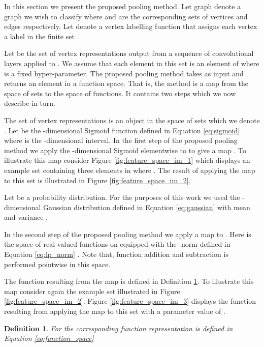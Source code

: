 \documentclass[runningheads]{llncs}
\newtheorem{mydef}{Definition}
\begin{document}
In this section we present the proposed pooling method. Let graph  denote a graph we wish to classify where  and  are the corresponding sets of vertices and edges respectively. Let  denote a vertex labelling function that assigns each vertex  a label  in the finite set .

Let  be the set of vertex representations output from a sequence of convolutional layers applied to . We assume that each element in this set is an element of  where  is a fixed hyper-parameter. The proposed pooling method takes as input  and returns an element in a function space. That is, the method is a map from the space of sets to the space of functions. It contains two steps which we now describe in turn.

The set of vertex representations  is an object in the space of sets which we denote . Let  be the -dimensional Sigmoid function defined in Equation \ref{eq:sigmoid} where  is the -dimensional interval. In the first step of the proposed pooling method we apply the -dimensional Sigmoid elementwise to  to give a map . To illustrate this map consider Figure \ref{fig:feature_space_im_1} which displays an example set  containing three elements in  where . The result of applying the map  to this set is illustrated in Figure \ref{fig:feature_space_im_2}.



Let  be a probability distribution. For the purposes of this work we used the -dimensional Gaussian distribution defined in Equation \ref{eq:gaussian} with mean  and variance .



In the second step of the proposed pooling method we apply a map  to . Here  is the space of real valued functions on  equipped with the -norm defined in Equation \ref{eq:lp_norm} \cite{Chr10}. Note that, function addition and subtraction is performed pointwise in this space.



The function resulting from the map  is defined in Definition \ref{def:map}. To illustrate this map consider again the example set  illustrated in Figure \ref{fig:feature_space_im_2}. Figure \ref{fig:feature_space_im_3} displays the function  resulting from applying the map  to this set with a  parameter value of .

\vspace{.5cm}
\begin{mydef}
\label{def:map}
For  the corresponding function representation  is defined in Equation \ref{eq:function_space}

\end{mydef}
\vspace{.5cm}
\end{document}
